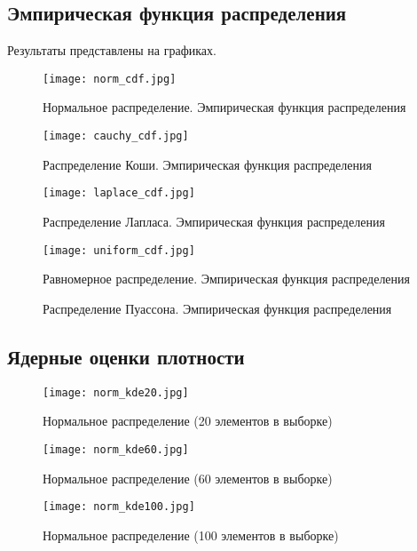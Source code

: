 \documentclass[main.tex]{subfiles}
\begin{document}
\subsection{Эмпирическая функция распределения}
Результаты представлены на графиках.
\begin{figure}[H]
	\centering \texttt{[image: norm\_cdf.jpg]}
	\caption{Нормальное распределение. Эмпирическая функция распределения}
	\label{img:norm_cdf}
\end{figure}
\begin{figure}[H]
	\centering \texttt{[image: cauchy\_cdf.jpg]}
	\caption{Распределение Коши. Эмпирическая функция распределения}
	\label{img:cauchy_cdf}
\end{figure}
\begin{figure}[H]
	\centering \texttt{[image: laplace\_cdf.jpg]}
	\caption{Распределение Лапласа. Эмпирическая функция распределения}
	\label{img:laplace_cdf}
\end{figure}
\begin{figure}[H]
	\centering \texttt{[image: uniform\_cdf.jpg]}
	\caption{Равномерное распределение. Эмпирическая функция распределения}
	\label{img:uniform_cdf}
\end{figure}
\begin{figure}[H]
	\caption{Распределение Пуассона. Эмпирическая функция распределения}
	\label{img:poisson_cdf}
\end{figure}

\subsection{Ядерные оценки плотности}

\begin{figure}[H]
	\centering \texttt{[image: norm\_kde20.jpg]}
	\caption{Нормальное распределение (20 элементов в выборке)}
	\label{img:norm_kde20}
\end{figure}
\begin{figure}[H]
	\centering \texttt{[image: norm\_kde60.jpg]}
	\caption{Нормальное распределение (60 элементов в выборке)}
	\label{img:norm_kde60}
\end{figure}
\begin{figure}[H]
	\centering \texttt{[image: norm\_kde100.jpg]}
	\caption{Нормальное распределение (100 элементов в выборке)}
	\label{img:norm_kde100}
\end{figure}
\end{document}
